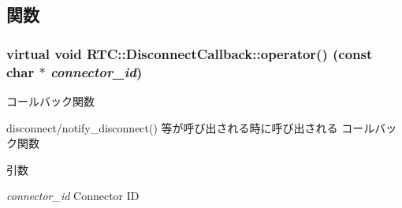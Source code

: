 \subsection{関数}
\subsubsection[{operator()}]{\setlength{\rightskip}{0pt plus 5cm}virtual void RTC::DisconnectCallback::operator() (const char $\ast$ {\em connector\_\-id})\hspace{0.3cm}{\ttfamily  [pure virtual]}}\label{classRTC_1_1DisconnectCallback_a2b4b524ad261d6da63e6649434015dab}


コールバック関数 

disconnect/notify\_\-disconnect() 等が呼び出される時に呼び出される コールバック関数


\begin{DoxyParams}{引数}
\item[{\em connector\_\-id}]Connector ID \end{DoxyParams}
